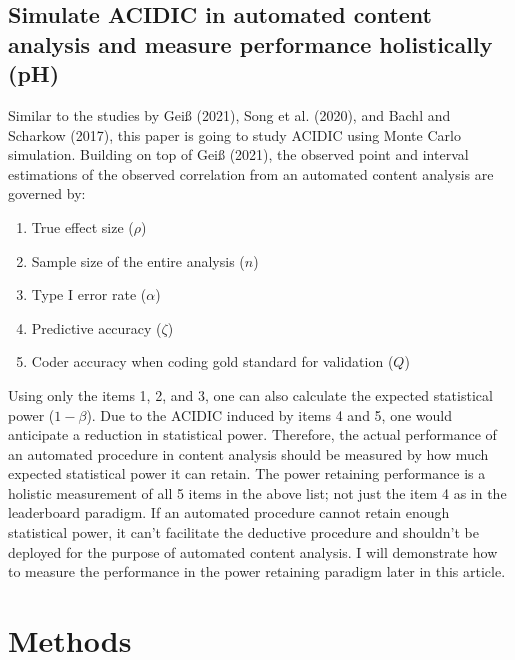\documentclass[english,man,floatsintext]{apa6}
\providecommand{\tightlist}{%
  \setlength{\itemsep}{0pt}\setlength{\parskip}{0pt}}
\begin{document}
\hypertarget{simulate-acidic-in-automated-content-analysis-and-measure-performance-holistically-ph}{%
\subsection{Simulate ACIDIC in automated content analysis and measure performance holistically (pH)}\label{simulate-acidic-in-automated-content-analysis-and-measure-performance-holistically-ph}}

Similar to the studies by Geiß (2021), Song et al. (2020), and Bachl and Scharkow (2017), this paper is going to study ACIDIC using Monte Carlo simulation. Building on top of Geiß (2021), the observed point and interval estimations of the observed correlation from an automated content analysis are governed by:

\begin{enumerate}
\def\labelenumi{\arabic{enumi}.}
\tightlist
\item
  True effect size (\(\rho\))
\item
  Sample size of the entire analysis (\(n\))
\item
  Type I error rate (\(\alpha\))
\item
  Predictive accuracy (\(\zeta\))
\item
  Coder accuracy when coding gold standard for validation (\(Q\))
\end{enumerate}

Using only the items 1, 2, and 3, one can also calculate the expected statistical power (\(1 - \beta\)). Due to the ACIDIC induced by items 4 and 5, one would anticipate a reduction in statistical power. Therefore, the actual performance of an automated procedure in content analysis should be measured by how much expected statistical power it can retain. The power retaining performance is a holistic measurement of all 5 items in the above list; not just the item 4 as in the leaderboard paradigm. If an automated procedure cannot retain enough statistical power, it can't facilitate the deductive procedure and shouldn't be deployed for the purpose of automated content analysis. I will demonstrate how to measure the performance in the power retaining paradigm later in this article.

\hypertarget{methods}{%
\section{Methods}\label{methods}}
\end{document}
